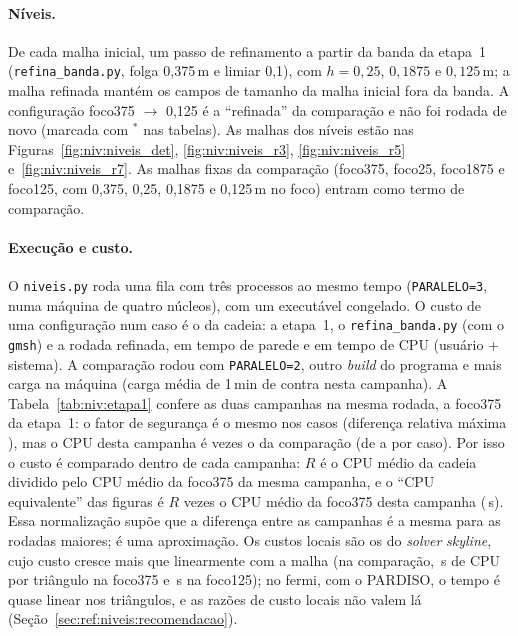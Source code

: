 \paragraph{Níveis.} De cada malha inicial, um passo de refinamento a partir da banda da etapa~1
(\texttt{refina\_\allowbreak banda.py}, folga 0,375\,m e limiar 0,1), com $h = 0{,}25$, $0{,}1875$ e $0{,}125$\,m; a malha refinada
mantém os campos de tamanho da malha inicial fora da banda. A configuração foco375 $\to$ 0,125 é a ``refinada'' da
comparação e não foi rodada de novo (marcada com $^{*}$ nas tabelas). As malhas dos níveis estão nas
Figuras~\ref{fig:niv:niveis_det}, \ref{fig:niv:niveis_r3}, \ref{fig:niv:niveis_r5} e~\ref{fig:niv:niveis_r7}. As
malhas fixas da comparação (foco375, foco25, foco1875 e foco125, com 0,375, 0,25, 0,1875 e 0,125\,m no foco) entram
como termo de comparação.

\paragraph{Execução e custo.} O \texttt{niveis.py} roda uma fila com três processos ao mesmo tempo
(\texttt{PARALELO=3}, numa máquina de quatro núcleos), com um executável congelado. O custo de uma configuração num
caso é o da cadeia: a etapa~1, o \texttt{refina\_\allowbreak banda.py} (com o \texttt{gmsh}) e a rodada refinada, em tempo de
parede e em tempo de CPU (usuário + sistema). A comparação rodou com \texttt{PARALELO=2}, outro \emph{build} do
programa e mais carga na máquina (carga média de 1\,min de \nivCargaComp{} contra \nivCargaNova{} nesta campanha). A
Tabela~\ref{tab:niv:etapa1} confere as duas campanhas na mesma rodada, a foco375 da etapa~1: o fator de segurança é
o mesmo nos \nivNcasosEtapaUm{} casos (diferença relativa máxima \nivDifEtapaUm), mas o CPU desta campanha é
\nivRazEtapa{} vezes o da comparação (de \nivRazEtapaMin{} a \nivRazEtapaMax{} por caso). Por isso o custo é
comparado dentro de cada campanha: $R$ é o CPU médio da cadeia dividido pelo CPU médio da foco375 da mesma campanha, e
o ``CPU equivalente'' das figuras é $R$ vezes o CPU médio da foco375 desta campanha (\nivCpuNova\,s). Essa
normalização supõe que a diferença entre as campanhas é a mesma para as rodadas maiores; é uma aproximação. Os
custos locais são os do \emph{solver} \emph{skyline}, cujo custo cresce mais que linearmente com a malha (na
comparação, \nivCpuTriA\,s de CPU por triângulo na foco375 e \nivCpuTriD\,s na foco125); no fermi, com o PARDISO, o
tempo é quase linear nos triângulos, e as razões de custo locais não valem lá
(Seção~\ref{sec:ref:niveis:recomendacao}).


